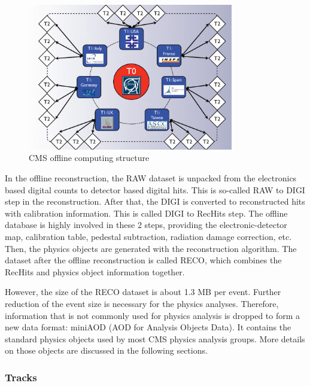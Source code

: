 \begin{figure}[htbp]
 \begin{center}
  \includegraphics[width=0.8\textwidth]{figures/c3/c3_cms_tiers.png}
 \end{center}
 \caption{CMS offline computing structure}
 \label{fig:c3cmstiers}
\end{figure}

In the offline reconstruction, the RAW dataset is unpacked from the electronics based digital counts to detector based digital hits. This is so-called RAW to DIGI step in the reconstruction. After that, the DIGI is converted to reconstructed hits with calibration information. This is called DIGI to RecHits step. The offline database is highly involved in these 2 steps, providing the electronic-detector map, calibration table, pedestal subtraction, radiation damage correction, etc. Then, the physics objects are generated with the reconstruction algorithm. The dataset after the offline reconstruction is called RECO, which combines the RecHits and physics object information together. 

However, the size of the RECO dataset is about 1.3 MB per event. Further reduction of the event size is necessary for the physics analyses. Therefore, information that is not commonly used for physics analysis is dropped to form a new data format: miniAOD (AOD for Analysis Objects Data). It contains the standard physics objects used by most CMS physics analysis groups. More details on those objects are discussed in the following sections. 

\subsubsection{Tracks}

